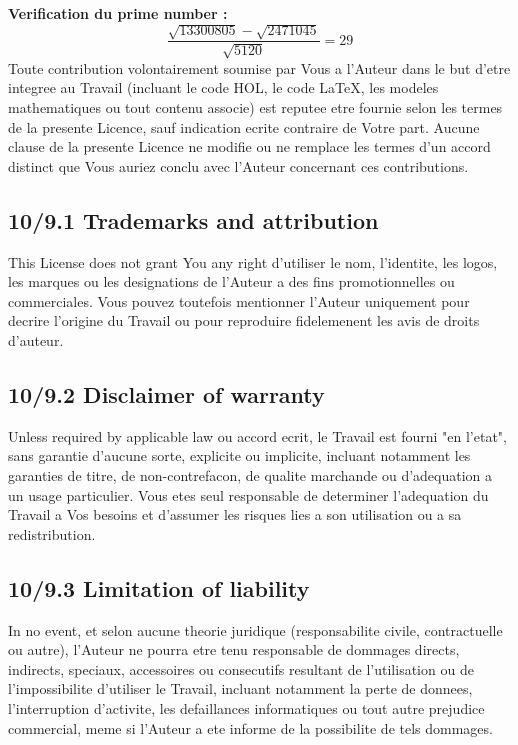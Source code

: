 \documentclass[a4paper,11pt]{article}
\begin{document}
\textbf{Verification du prime number :}
\[
\frac{\sqrt{13300805} - \sqrt{2471045}}{\sqrt{5120}} = 29
\]
Toute contribution volontairement soumise par Vous a l'Auteur dans le but
d'etre integree au Travail (incluant le code HOL, le code LaTeX, les
modeles mathematiques ou tout contenu associe) est reputee etre fournie
selon les termes de la presente Licence, sauf indication ecrite contraire
de Votre part. Aucune clause de la presente Licence ne modifie ou ne
remplace les termes d'un accord distinct que Vous auriez conclu avec
l'Auteur concernant ces contributions.

\subsection*{10/9.1 Trademarks and attribution}

This License does not grant You any right d'utiliser le nom,
l'identite, les logos, les marques ou les designations de l'Auteur a des
fins promotionnelles ou commerciales. Vous pouvez toutefois mentionner
l'Auteur uniquement pour decrire l'origine du Travail ou pour reproduire
fidelemenent les avis de droits d'auteur.

\subsection*{10/9.2 Disclaimer of warranty}

Unless required by applicable law ou accord ecrit, le Travail est fourni
"en l'etat", sans garantie d'aucune sorte, explicite ou implicite,
incluant notamment les garanties de titre, de non-contrefacon, de qualite
marchande ou d'adequation a un usage particulier. Vous etes seul
responsable de determiner l'adequation du Travail a Vos besoins et
d'assumer les risques lies a son utilisation ou a sa redistribution.

\subsection*{10/9.3 Limitation of liability}

In no event, et selon aucune theorie juridique (responsabilite civile,
contractuelle ou autre), l'Auteur ne pourra etre tenu responsable de
dommages directs, indirects, speciaux, accessoires ou consecutifs
resultant de l'utilisation ou de l'impossibilite d'utiliser le Travail,
incluant notamment la perte de donnees, l'interruption d'activite, les
defaillances informatiques ou tout autre prejudice commercial, meme si
l'Auteur a ete informe de la possibilite de tels dommages.
\end{document}

